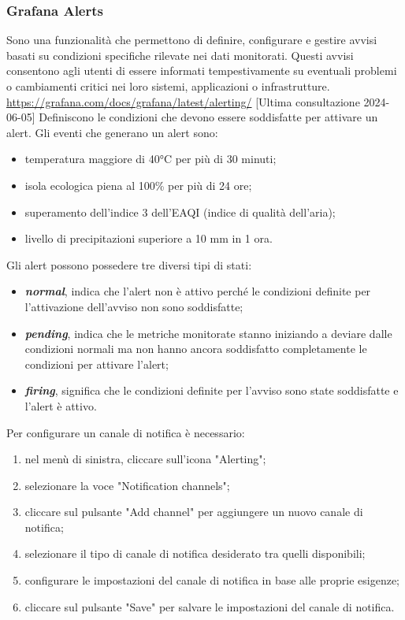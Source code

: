 \subsubsection{Grafana Alerts}
Sono una funzionalità che permettono di definire, configurare e gestire avvisi basati su condizioni specifiche rilevate nei dati monitorati. Questi avvisi consentono agli utenti di essere informati tempestivamente su eventuali problemi o cambiamenti critici nei loro sistemi, applicazioni o infrastrutture.
\url{https://grafana.com/docs/grafana/latest/alerting/} [Ultima consultazione 2024-06-05]
Definiscono le condizioni che devono essere soddisfatte per attivare un alert. Gli eventi che generano un alert sono:
\begin{itemize}
	\item temperatura maggiore di 40°C per più di 30 minuti;
	\item isola ecologica piena al 100\% per più di 24 ore;
	\item superamento dell'indice 3 dell'EAQI (indice di qualità dell'aria);
	\item livello di precipitazioni superiore a 10 mm in 1 ora.
\end{itemize}
Gli alert possono possedere tre diversi tipi di stati:
\begin{itemize}
	\item \textbf{\textit{normal}}, indica che l'alert non è attivo perché le condizioni definite per l'attivazione dell'avviso non sono soddisfatte;
	\item \textbf{\textit{pending}}, indica che le metriche monitorate stanno iniziando a deviare dalle condizioni normali ma non hanno ancora soddisfatto completamente le condizioni per attivare l'alert;
	\item \textbf{\textit{firing}}, significa che le condizioni definite per l'avviso sono state soddisfatte e l'alert è attivo.
\end{itemize}
Per configurare un canale di notifica è necessario:
\begin{enumerate}
	\item nel menù di sinistra, cliccare sull'icona "Alerting";
	\item selezionare la voce "Notification channels";
	\item cliccare sul pulsante "Add channel" per aggiungere un nuovo canale di notifica;
	\item selezionare il tipo di canale di notifica desiderato tra quelli disponibili;
	\item configurare le impostazioni del canale di notifica in base alle proprie esigenze;
	\item cliccare sul pulsante "Save" per salvare le impostazioni del canale di notifica.
\end{enumerate}

